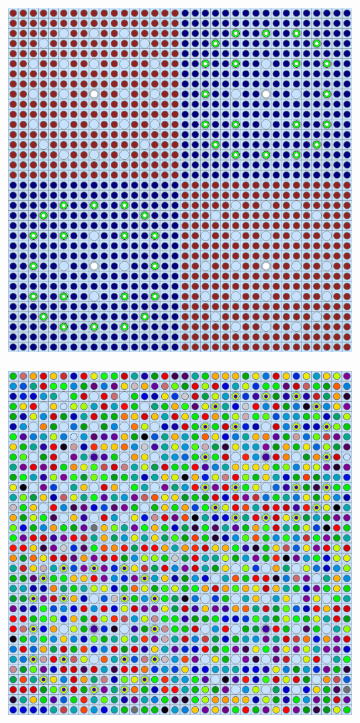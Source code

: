 \begin{figure}[h!]
\begin{subfigure}{.45\textwidth}
  \caption{}
  \label{fig:chap8-assm-16-degenerate-materials}
\end{subfigure}
\begin{subfigure}{.45\textwidth}
  \centering
  \includegraphics[width=0.87\linewidth]{figures/quantification/homogenization/2x2-null-materials}
  \caption{}
  \label{fig:chap8-2x2-null-materials}
\end{subfigure}%
\begin{subfigure}{.45\textwidth}
  \centering
  \includegraphics[width=0.87\linewidth]{figures/quantification/homogenization/2x2-degenerate-materials}

\end{subfigure}
\end{figure}
